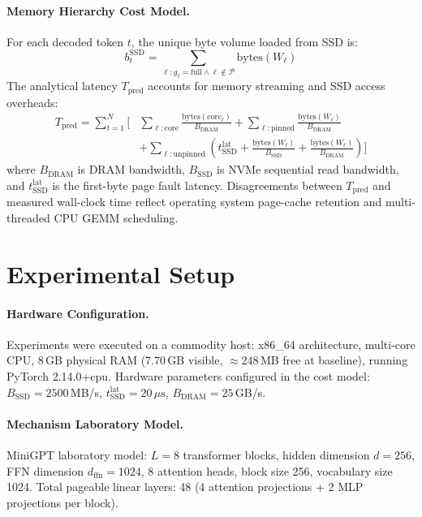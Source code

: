 \documentclass[11pt,a4paper]{article}
\begin{document}
\paragraph{Memory Hierarchy Cost Model.}
For each decoded token $t$, the unique byte volume loaded from SSD is:
\begin{equation}
    b_t^{\text{SSD}} = \sum_{\ell: g_\ell = \text{full} \wedge \ell \notin \mathcal{P}} \text{bytes}(W_\ell)
\end{equation}
The analytical latency $T_{\text{pred}}$ accounts for memory streaming and SSD access overheads:
\begin{equation}
\begin{split}
    T_{\text{pred}} = \sum_{t=1}^N \Biggl[ & \sum_{\ell: \text{core}} \frac{\text{bytes}(\text{core}_\ell)}{B_{\text{DRAM}}} + \sum_{\ell: \text{pinned}} \frac{\text{bytes}(W_\ell)}{B_{\text{DRAM}}} \\
    & + \sum_{\ell: \text{unpinned}} \left( t_{\text{SSD}}^{\text{lat}} + \frac{\text{bytes}(W_\ell)}{B_{\text{SSD}}} + \frac{\text{bytes}(W_\ell)}{B_{\text{DRAM}}} \right) \Biggr]
\end{split}
\end{equation}
where $B_{\text{DRAM}}$ is DRAM bandwidth, $B_{\text{SSD}}$ is NVMe sequential read bandwidth, and $t_{\text{SSD}}^{\text{lat}}$ is the first-byte page fault latency. Disagreements between $T_{\text{pred}}$ and measured wall-clock time reflect operating system page-cache retention and multi-threaded CPU GEMM scheduling.

\section{Experimental Setup}
\paragraph{Hardware Configuration.}
Experiments were executed on a commodity host: x86\_64 architecture, multi-core CPU, 8\,GB physical RAM (7.70\,GB visible, $\approx 248$\,MB free at baseline), running PyTorch 2.14.0+cpu. Hardware parameters configured in the cost model: $B_{\text{SSD}} = 2500$\,MB/s, $t_{\text{SSD}}^{\text{lat}} = 20\,\mu\text{s}$, $B_{\text{DRAM}} = 25$\,GB/s.

\paragraph{Mechanism Laboratory Model.}
MiniGPT laboratory model: $L=8$ transformer blocks, hidden dimension $d=256$, FFN dimension $d_{\text{ffn}}=1024$, 8 attention heads, block size 256, vocabulary size 1024. Total pageable linear layers: 48 (4 attention projections + 2 MLP projections per block).
\end{document}
